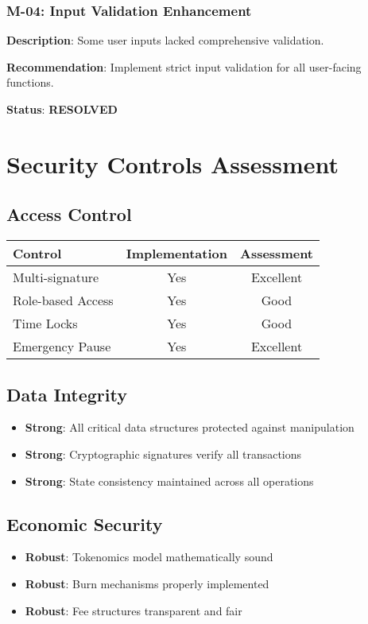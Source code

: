 \documentclass[11pt,a4paper]{article}
\begin{document}
\subsubsection{M-04: Input Validation Enhancement}
\textbf{Description}: Some user inputs lacked comprehensive validation.

\textbf{Recommendation}: Implement strict input validation for all user-facing functions.

\textbf{Status}: \textcolor{danzoGreen}{\textbf{RESOLVED}}

\section{Security Controls Assessment}

\subsection{Access Control}
\begin{center}
\begin{tabular}{|l|c|c|}
\hline
\textbf{Control} & \textbf{Implementation} & \textbf{Assessment} \\
\hline
Multi-signature & Yes & \textcolor{danzoGreen}{Excellent} \\
Role-based Access & Yes & \textcolor{danzoGreen}{Good} \\
Time Locks & Yes & \textcolor{danzoGreen}{Good} \\
Emergency Pause & Yes & \textcolor{danzoGreen}{Excellent} \\
\hline
\end{tabular}
\end{center}

\subsection{Data Integrity}
\begin{itemize}
    \item \textcolor{danzoGreen}{\textbf{Strong}}: All critical data structures protected against manipulation
    \item \textcolor{danzoGreen}{\textbf{Strong}}: Cryptographic signatures verify all transactions
    \item \textcolor{danzoGreen}{\textbf{Strong}}: State consistency maintained across all operations
\end{itemize}

\subsection{Economic Security}
\begin{itemize}
    \item \textcolor{danzoGreen}{\textbf{Robust}}: Tokenomics model mathematically sound
    \item \textcolor{danzoGreen}{\textbf{Robust}}: Burn mechanisms properly implemented
    \item \textcolor{danzoGreen}{\textbf{Robust}}: Fee structures transparent and fair
\end{itemize}
\end{document}
